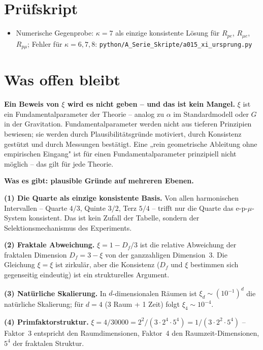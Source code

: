 \section{Prüfskript}

\begin{itemize}[leftmargin=2em,itemsep=2pt,topsep=2pt]
  \item Numerische Gegenprobe: $\kappa=7$ als einzige konsistente Lösung für
    $R_{pe}$, $R_{\mu e}$, $R_{p\mu}$; Fehler für $\kappa=6,7,8$:
    \texttt{python/A\_Serie\_Skripte/a015\_xi\_ursprung.py}
\end{itemize}

\section{Was offen bleibt}

\textbf{Ein Beweis von $\xi$ wird es nicht geben -- und das ist kein Mangel.}
$\xi$ ist ein Fundamentalparameter der Theorie -- analog zu $\alpha$ im
Standardmodell oder $G$ in der Gravitation. Fundamentalparameter werden nicht
aus tieferen Prinzipien bewiesen; sie werden durch Plausibilitätsgründe
motiviert, durch Konsistenz gestützt und durch Messungen bestätigt. Eine
„rein geometrische Ableitung ohne empirischen Eingang" ist für einen
Fundamentalparameter prinzipiell nicht möglich -- das gilt für jede Theorie.

\textbf{Was es gibt: plausible Gründe auf mehreren Ebenen.}

\textbf{(1) Die Quarte als einzige konsistente Basis.} Von allen harmonischen
Intervallen -- Quarte $4/3$, Quinte $3/2$, Terz $5/4$ -- trifft nur die
Quarte das e-p-$\mu$-System konsistent. Das ist kein Zufall der Tabelle,
sondern der Selektionsmechanismus des Experiments.

\textbf{(2) Fraktale Abweichung.} $\xi=1-D_f/3$ ist die relative Abweichung
der fraktalen Dimension $D_f=3-\xi$ von der ganzzahligen Dimension~3.
Die Gleichung $\xi=\xi$ ist zirkulär, aber die Konsistenz ($D_f$ und $\xi$
bestimmen sich gegenseitig eindeutig) ist ein strukturelles Argument.

\textbf{(3) Natürliche Skalierung.} In $d$-dimensionalen Räumen ist $\xi_d
\sim(10^{-1})^d$ die natürliche Skalierung; für $d=4$ (3 Raum + 1 Zeit)
folgt $\xi_4\sim10^{-4}$.

\textbf{(4) Primfaktorstruktur.} $\xi=4/30000=2^2/(3\cdot2^4\cdot5^4)
=1/(3\cdot2^2\cdot5^4)$ -- Faktor~3 entspricht den Raumdimensionen,
Faktor~4 den Raumzeit-Dimensionen, $5^4$ der fraktalen Struktur.

